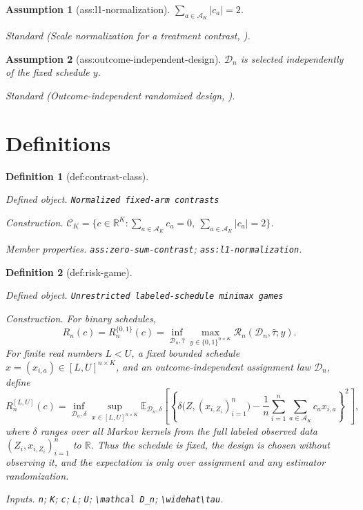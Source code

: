 \documentclass{article}
\newtheorem{assumption}{Assumption}
\newtheorem{definition}{Definition}
\begin{document}
\begin{assumption}[ass:l1-normalization]\label{ass:l1-normalization}
\(\sum_{a\in\mathcal A_K}|c_a|=2\).
\par\smallskip\noindent\emph{Standard} (Scale normalization for a treatment contrast, \cite{DasguptaPillaiRubin2015}).
\end{assumption}

\begin{assumption}[ass:outcome-independent-design]\label{ass:outcome-independent-design}
\(\mathcal D_n\) is selected independently of the fixed schedule \(y\).
\par\smallskip\noindent\emph{Standard} (Outcome-independent randomized design, \cite{SudijonoDobribanTchetgen2026}).
\end{assumption}

\section{Definitions}

\begin{definition}[def:contrast-class]\label{def:contrast-class}
\par\smallskip\noindent\emph{Defined object.} \texttt{Normalized fixed-\allowbreak{}arm contrasts}
\par\smallskip\noindent\emph{Construction.} \(\mathcal C_K=\{c\in\mathbb R^K: \sum_{a\in\mathcal A_K}c_a=0,\ \sum_{a\in\mathcal A_K}|c_a|=2\}\).
\par\smallskip\noindent\emph{Member properties.} \texttt{ass:\allowbreak{}zero-\allowbreak{}sum-\allowbreak{}contrast}; \texttt{ass:\allowbreak{}l1-\allowbreak{}normalization}.
\end{definition}

\begin{definition}[def:risk-game]\label{def:risk-game}
\par\smallskip\noindent\emph{Defined object.} \texttt{Unrestricted labeled-\allowbreak{}schedule minimax games}
\par\smallskip\noindent\emph{Construction.} For binary schedules,
\[
R_n(c)=R_n^{\{0,1\}}(c)
=\inf_{\mathcal D_n,\widehat\tau}
\max_{y\in\{0,1\}^{n\times K}}
\mathcal R_n(\mathcal D_n,\widehat\tau;y).
\]
For finite real numbers \(L<U\), a fixed bounded schedule \(x=(x_{i,a})\in[L,U]^{n\times K}\), and an outcome-independent assignment law \(\mathcal D_n\), define
\[
R_n^{[L,U]}(c)
=\inf_{\mathcal D_n,\delta}
\sup_{x\in[L,U]^{n\times K}}
\mathbb E_{\mathcal D_n,\delta}
\left[
\left\{
\delta\bigl(Z,(x_{i,Z_i})_{i=1}^n\bigr)
-\frac1n\sum_{i=1}^n\sum_{a\in\mathcal A_K}c_ax_{i,a}
\right\}^{2}
\right],
\]
where \(\delta\) ranges over all Markov kernels from the full labeled observed data \((Z_i,x_{i,Z_i})_{i=1}^n\) to \(\mathbb R\).  Thus the schedule is fixed, the design is chosen without observing it, and the expectation is only over assignment and any estimator randomization.
\par\smallskip\noindent\emph{Inputs.} \texttt{n}; \texttt{K}; \texttt{c}; \texttt{L}; \texttt{U}; \texttt{\textbackslash{}\allowbreak{}mathcal D\_\allowbreak{}n}; \texttt{\textbackslash{}\allowbreak{}widehat\textbackslash{}\allowbreak{}tau}.
\end{definition}
\end{document}
